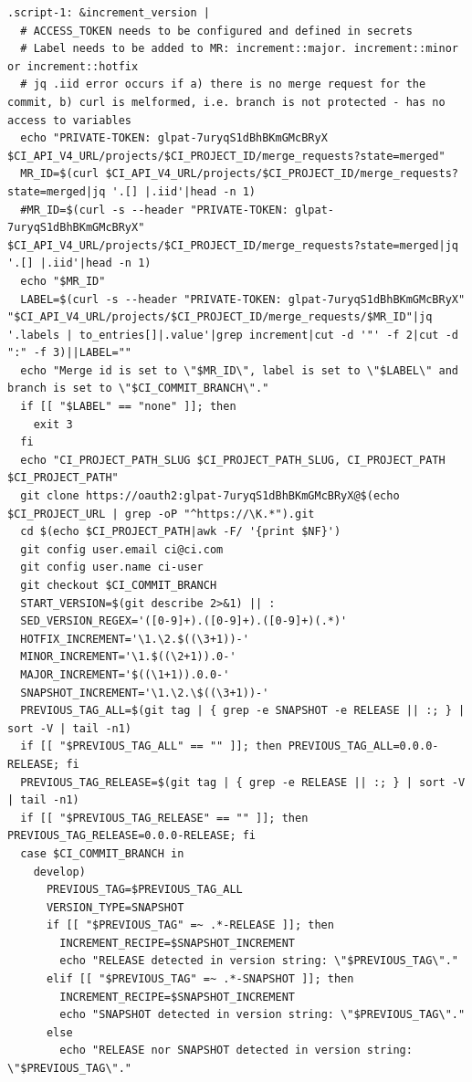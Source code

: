 \documentclass[a4paper,12pt,oneside]{article}
\begin{document}
\begin{lstlisting}
.script-1: &increment_version |
  # ACCESS_TOKEN needs to be configured and defined in secrets
  # Label needs to be added to MR: increment::major. increment::minor or increment::hotfix
  # jq .iid error occurs if a) there is no merge request for the commit, b) curl is melformed, i.e. branch is not protected - has no access to variables
  echo "PRIVATE-TOKEN: glpat-7uryqS1dBhBKmGMcBRyX $CI_API_V4_URL/projects/$CI_PROJECT_ID/merge_requests?state=merged"
  MR_ID=$(curl $CI_API_V4_URL/projects/$CI_PROJECT_ID/merge_requests?state=merged|jq '.[] |.iid'|head -n 1)
  #MR_ID=$(curl -s --header "PRIVATE-TOKEN: glpat-7uryqS1dBhBKmGMcBRyX" $CI_API_V4_URL/projects/$CI_PROJECT_ID/merge_requests?state=merged|jq '.[] |.iid'|head -n 1)
  echo "$MR_ID"
  LABEL=$(curl -s --header "PRIVATE-TOKEN: glpat-7uryqS1dBhBKmGMcBRyX" "$CI_API_V4_URL/projects/$CI_PROJECT_ID/merge_requests/$MR_ID"|jq '.labels | to_entries[]|.value'|grep increment|cut -d '"' -f 2|cut -d ":" -f 3)||LABEL=""
  echo "Merge id is set to \"$MR_ID\", label is set to \"$LABEL\" and branch is set to \"$CI_COMMIT_BRANCH\"."
  if [[ "$LABEL" == "none" ]]; then
    exit 3
  fi
  echo "CI_PROJECT_PATH_SLUG $CI_PROJECT_PATH_SLUG, CI_PROJECT_PATH $CI_PROJECT_PATH"
  git clone https://oauth2:glpat-7uryqS1dBhBKmGMcBRyX@$(echo $CI_PROJECT_URL | grep -oP "^https://\K.*").git
  cd $(echo $CI_PROJECT_PATH|awk -F/ '{print $NF}')
  git config user.email ci@ci.com
  git config user.name ci-user
  git checkout $CI_COMMIT_BRANCH
  START_VERSION=$(git describe 2>&1) || :
  SED_VERSION_REGEX='([0-9]+).([0-9]+).([0-9]+)(.*)'
  HOTFIX_INCREMENT='\1.\2.$((\3+1))-'
  MINOR_INCREMENT='\1.$((\2+1)).0-'
  MAJOR_INCREMENT='$((\1+1)).0.0-'
  SNAPSHOT_INCREMENT='\1.\2.\$((\3+1))-'
  PREVIOUS_TAG_ALL=$(git tag | { grep -e SNAPSHOT -e RELEASE || :; } | sort -V | tail -n1)
  if [[ "$PREVIOUS_TAG_ALL" == "" ]]; then PREVIOUS_TAG_ALL=0.0.0-RELEASE; fi
  PREVIOUS_TAG_RELEASE=$(git tag | { grep -e RELEASE || :; } | sort -V | tail -n1)
  if [[ "$PREVIOUS_TAG_RELEASE" == "" ]]; then PREVIOUS_TAG_RELEASE=0.0.0-RELEASE; fi
  case $CI_COMMIT_BRANCH in
    develop)
      PREVIOUS_TAG=$PREVIOUS_TAG_ALL
      VERSION_TYPE=SNAPSHOT
      if [[ "$PREVIOUS_TAG" =~ .*-RELEASE ]]; then
        INCREMENT_RECIPE=$SNAPSHOT_INCREMENT
        echo "RELEASE detected in version string: \"$PREVIOUS_TAG\"."
      elif [[ "$PREVIOUS_TAG" =~ .*-SNAPSHOT ]]; then
        INCREMENT_RECIPE=$SNAPSHOT_INCREMENT
        echo "SNAPSHOT detected in version string: \"$PREVIOUS_TAG\"."
      else
        echo "RELEASE nor SNAPSHOT detected in version string: \"$PREVIOUS_TAG\"."

\end{lstlisting}
\end{document}
